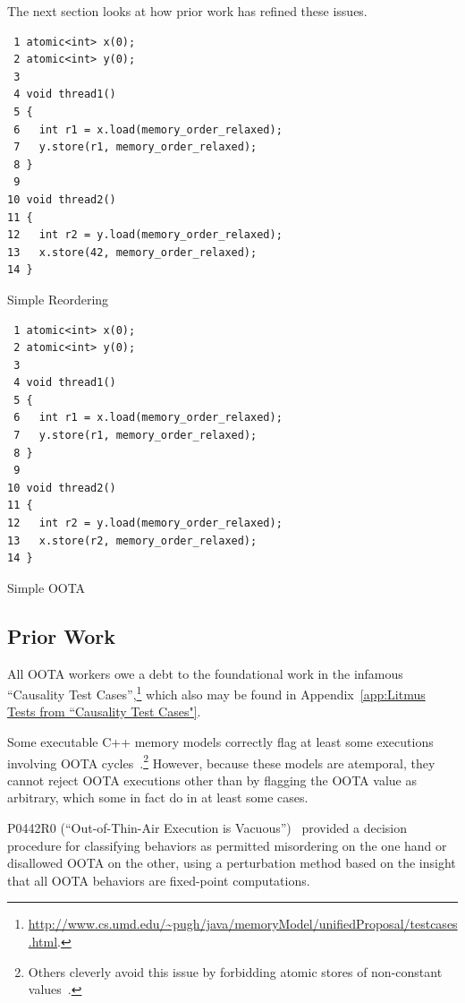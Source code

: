 \documentclass[10]{article}
\begin{document}
The next section looks at how prior work has refined these issues.

\begin{listing}[tbp]
\begin{verbatim}
 1 atomic<int> x(0);
 2 atomic<int> y(0);
 3
 4 void thread1()
 5 {
 6   int r1 = x.load(memory_order_relaxed);
 7   y.store(r1, memory_order_relaxed);
 8 }
 9
10 void thread2()
11 {
12   int r2 = y.load(memory_order_relaxed);
13   x.store(42, memory_order_relaxed);
14 }
\end{verbatim}
\caption{Simple Reordering}
\label{lst:Simple Reordering}
\end{listing}

\begin{listing}[tbp]
\begin{verbatim}
 1 atomic<int> x(0);
 2 atomic<int> y(0);
 3
 4 void thread1()
 5 {
 6   int r1 = x.load(memory_order_relaxed);
 7   y.store(r1, memory_order_relaxed);
 8 }
 9
10 void thread2()
11 {
12   int r2 = y.load(memory_order_relaxed);
13   x.store(r2, memory_order_relaxed);
14 }
\end{verbatim}
\caption{Simple OOTA}
\label{lst:Simple OOTA}
\end{listing}

\subsection{Prior Work}
\label{sec:Prior Work}

All OOTA workers owe a debt to the foundational work in the infamous
``Causality Test Cases'',\footnote{
	\url{http://www.cs.umd.edu/~pugh/java/memoryModel/unifiedProposal/testcases.html}.}
which also may be found in
Appendix~\ref{app:Litmus Tests from “Causality Test Cases"}.

Some executable C++ memory models correctly flag at least some executions
involving OOTA cycles~\cite{JadeAlglave2014HerdingCats}.\footnote{
	Others cleverly avoid this issue by forbidding atomic
	stores of non-constant values~\cite{MarkBatty2011cppmem}.}
However, because these models are atemporal, they cannot reject
OOTA executions other than by flagging the OOTA value as arbitrary,
which some in fact do in at least some cases.

P0442R0 (``Out-of-Thin-Air Execution is Vacuous'')~\cite{PaulEMcKenney2016OOTA}
provided a decision procedure for classifying behaviors as permitted
misordering on the one hand or disallowed OOTA on the other, using
a perturbation method based on the insight that all OOTA behaviors are
fixed-point computations.
\end{document}
